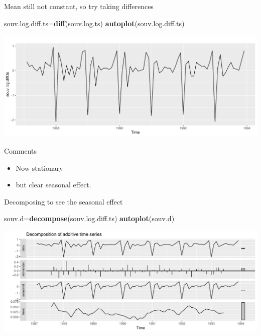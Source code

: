 \documentclass[
  ignorenonframetext,
]{beamer}
\newenvironment{Shaded}{\begin{snugshade}}{\end{snugshade}}
\newcommand{\KeywordTok}[1]{\textcolor[rgb]{0.13,0.29,0.53}{\textbf{#1}}}
\newcommand{\NormalTok}[1]{#1}
\providecommand{\tightlist}{%
  \setlength{\itemsep}{0pt}\setlength{\parskip}{0pt}}
\begin{document}
\begin{frame}[fragile]{Mean still not constant, so try taking
differences}
\protect\hypertarget{mean-still-not-constant-so-try-taking-differences}{}

\begin{Shaded}
\begin{Highlighting}[]
\NormalTok{souv.log.diff.ts=}\KeywordTok{diff}\NormalTok{(souv.log.ts)}
\KeywordTok{autoplot}\NormalTok{(souv.log.diff.ts)}
\end{Highlighting}
\end{Shaded}

\includegraphics{slides_d29_files/figure-beamer/unnamed-chunk-547-1.pdf}

\end{frame}

\begin{frame}{Comments}
\protect\hypertarget{comments-46}{}

\begin{itemize}
\tightlist
\item
  Now stationary
\item
  but clear seasonal effect.
\end{itemize}

\end{frame}

\begin{frame}[fragile]{Decomposing to see the seasonal effect}
\protect\hypertarget{decomposing-to-see-the-seasonal-effect}{}

\begin{Shaded}
\begin{Highlighting}[]
\NormalTok{souv.d=}\KeywordTok{decompose}\NormalTok{(souv.log.diff.ts)}
\KeywordTok{autoplot}\NormalTok{(souv.d)}
\end{Highlighting}
\end{Shaded}

\includegraphics{slides_d29_files/figure-beamer/unnamed-chunk-548-1.pdf}

\end{frame}
\end{document}
